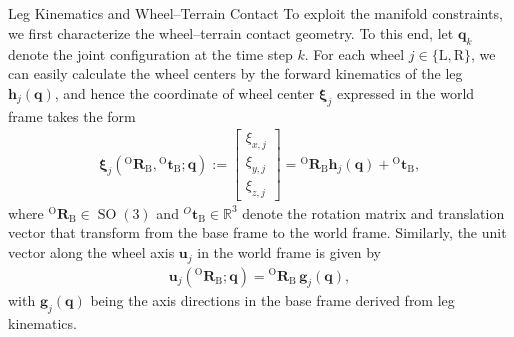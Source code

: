 \documentclass[journal,twoside,web]{ieeecolor}
\makeatletter
\newcommand{\mR}{\mathbb{R}}
\DeclareMathOperator*{\SO}{SO}
\let\origsubsection\subsection
\def\subsection{\@ifstar\subsectionstarcolor\subsectioncolorcmd}
\def\subsectioncolorcmd#1{\origsubsection{\textcolor{subsectioncolor}{#1}}}
\def\subsectionstarcolor#1{\origsubsection*{#1}}
\makeatother
\begin{document}
\subsection{Leg Kinematics and Wheel–Terrain Contact}
To exploit the manifold constraints, we first characterize the wheel–terrain contact geometry.
To this end, let \( \mathbf{q}_k \) denote the joint configuration at the time step $k$. For each wheel \(j\in\{\text{L},\text{R}\}\), we can easily calculate the wheel centers by the forward kinematics of the leg $\mathbf{h}_j(\mathbf{q})$, and hence the coordinate of wheel center $\bm\xi_j$ expressed in the world frame takes the form
\begin{align}\label{eq:leg_fk}
    \bm\xi_{j}({}^{\text{O}}\mathbf{R}_\text{B}, {}^{\text{O}}\mathbf{t}_{\text{B}}; \mathbf{q}):=\begin{bmatrix}
        \xi_{x,j}\\\xi_{y,j} \\ \xi_{z,j}
    \end{bmatrix}
    ={}^{\text{O}}\mathbf{R}_\text{B} \mathbf{h}_j(\mathbf{q})+{}^{\text{O}}\mathbf{t}_{\text{B}},
\end{align}
where ${}^{\text{O}}\mathbf{R}_\text{B}\in \SO(3)$ and ${}^{O}\mathbf{t}_{\text{B}}\in\mR^3$ denote the rotation matrix and translation vector that transform from the base frame to the world frame.
Similarly, the unit vector along the wheel axis $\mathbf{u}_j$ in the world frame is given by
\begin{align}
    \mathbf{u}_j({}^{\text{O}}\mathbf{R}_\text{B}; \mathbf{q}) = {}^{\text{O}}\mathbf{R}_\text{B}\, \mathbf{g}_j(\mathbf{q}),
\end{align}
 with \(\mathbf{g}_j(\mathbf{q})\) being the axis directions in the base frame derived from leg kinematics.
\end{document}
